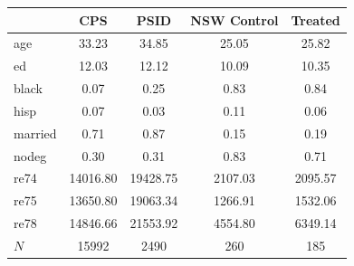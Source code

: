 {
\def\sym#1{\ifmmode^{#1}\else\(^{#1}\)\fi}
\begin{tabular}{l*{4}{c}}
\hline\hline
            &\multicolumn{1}{c}{CPS}&\multicolumn{1}{c}{PSID}&\multicolumn{1}{c}{NSW Control}&\multicolumn{1}{c}{Treated}\\
\hline
age         &       33.23&       34.85&       25.05&       25.82\\
ed          &       12.03&       12.12&       10.09&       10.35\\
black       &        0.07&        0.25&        0.83&        0.84\\
hisp        &        0.07&        0.03&        0.11&        0.06\\
married     &        0.71&        0.87&        0.15&        0.19\\
nodeg       &        0.30&        0.31&        0.83&        0.71\\
re74        &    14016.80&    19428.75&     2107.03&     2095.57\\
re75        &    13650.80&    19063.34&     1266.91&     1532.06\\
re78        &    14846.66&    21553.92&     4554.80&     6349.14\\
\hline
\(N\)       &       15992&        2490&         260&         185\\
\hline\hline
\end{tabular}
}
